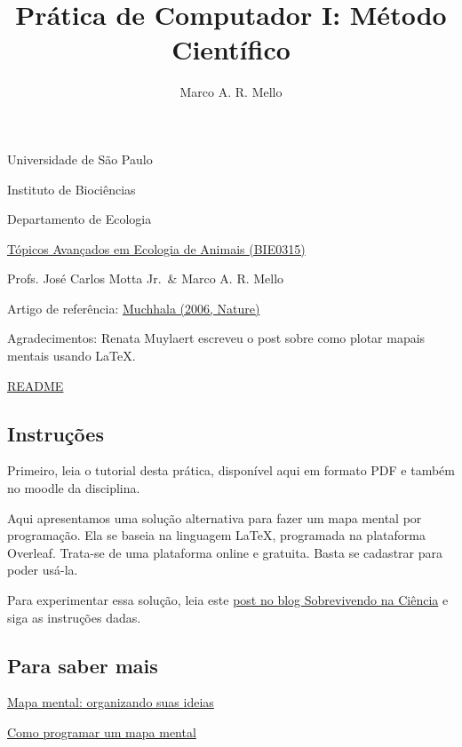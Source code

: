 \documentclass[
]{article}
\title{Prática de Computador I: Método Científico}
\author{Marco A. R. Mello}
\date{}
\begin{document}
\maketitle

Universidade de São Paulo

Instituto de Biociências

Departamento de Ecologia

\href{https://uspdigital.usp.br/jupiterweb/obterDisciplina?sgldis=BIE0315\&verdis=4}{Tópicos
Avançados em Ecologia de Animais (BIE0315)}

Profs. José Carlos Motta Jr.~\& Marco A. R. Mello

Artigo de referência: \href{https://doi.org/10.1038/444701a}{Muchhala
(2006, Nature)}

Agradecimentos: Renata Muylaert escreveu o post sobre como plotar mapais
mentais usando LaTeX.

\href{https://github.com/marmello77/EcoAnimal\#readme}{README}

\hypertarget{instruuxe7uxf5es}{%
\subsection{Instruções}\label{instruuxe7uxf5es}}

Primeiro, leia o tutorial desta prática, disponível aqui em formato PDF
e também no moodle da disciplina.

Aqui apresentamos uma solução alternativa para fazer um mapa mental por
programação. Ela se baseia na linguagem LaTeX, programada na plataforma
Overleaf. Trata-se de uma plataforma online e gratuita. Basta se
cadastrar para poder usá-la.

Para experimentar essa solução, leia este
\href{https://marcoarmello.wordpress.com/2022/04/13/como-programar-um-mapa-mental/}{post
no blog Sobrevivendo na Ciência} e siga as instruções dadas.

\hypertarget{para-saber-mais}{%
\subsection{Para saber mais}\label{para-saber-mais}}

\href{https://marcoarmello.wordpress.com/2015/04/15/mapasmentais/}{Mapa
mental: organizando suas ideias}

\href{https://marcoarmello.wordpress.com/2022/04/13/como-programar-um-mapa-mental/}{Como
programar um mapa mental}
\end{document}
